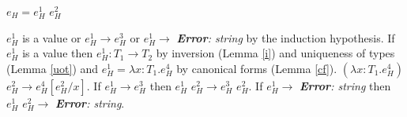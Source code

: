 \begin{case}

$e_{H}=e_{H}^{1}$ $e_{H}^{2}$

$e_{H}^{1}$ is a value or $e_{H}^{1}\rightarrow e_{H}^{3}$ or $e_{H}^{1}\rightarrow$ \emph{\textbf{Error}: string} by the induction hypothesis.  If $e_{H}^{1}$ is a value then $e_{H}^{1}:T_{1}\rightarrow T_{2}$ by inversion (Lemma \ref{i}) and uniqueness of types (Lemma \ref{uot}) and $e_{H}^{1}=\lambda x:T_{1}.e_{H}^{4}$ by canonical forms (Lemma \ref{cf}).  $(\lambda x:T_{1}.e_{H}^{4})$ $e_{H}^{2}\rightarrow e_{H}^{4}[e_{H}^{2}/x]$.  If $e_{H}^{1}\rightarrow e_{H}^{3}$ then $e_{H}^{1}$ $e_{H}^{2}\rightarrow e_{H}^{3}$ $e_{H}^{2}$.  If $e_{H}^{1}\rightarrow$ \emph{\textbf{Error}: string} then $e_{H}^{1}$ $e_{H}^{2}\rightarrow$ \emph{\textbf{Error}: string}.

\end{case}